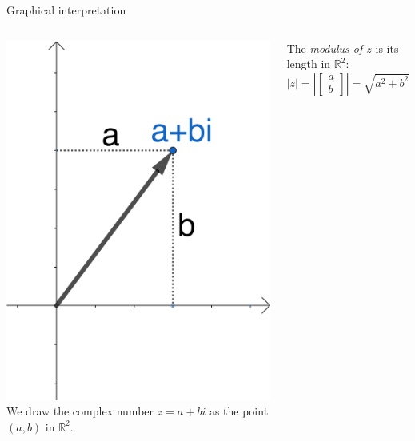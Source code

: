 \documentclass{beamer}
\begin{document}
\begin{frame}[fragile]{Graphical interpretation}
\begin{columns}
	\includegraphics[scale=0.8]{complex-plane.png}
	We draw the complex number $z=a+bi$ as the point $(a, b)$ in $\mathbb{R}^2$.\vfill
	\begin{definition}
	The \emph{modulus of $z$} is its length in $\mathbb{R}^2$:
	\begin{equation*}
	|z| = \left| \left[
	\begin{array}{c}
	a\\
	b
	\end{array}
	\right]\right| = \sqrt{a^2+b^2}
	\end{equation*}
	\end{definition}
\end{columns}
\end{frame}
\end{document}
